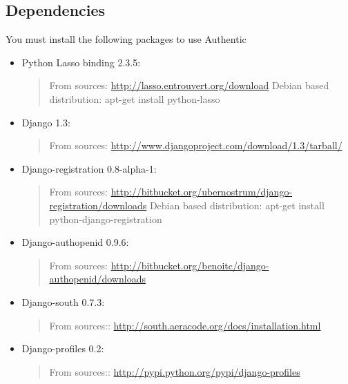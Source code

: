 \documentclass[letterpaper,10pt,english]{sphinxmanual}
\begin{document}
\subsection{Dependencies}
\label{installation:dependencies}
You must install the following packages to use Authentic
\begin{itemize}
\item {} 
Python Lasso binding 2.3.5:
\begin{quote}

From sources: \href{http://lasso.entrouvert.org/download}{http://lasso.entrouvert.org/download}
Debian based distribution: apt-get install python-lasso
\end{quote}

\item {} 
Django 1.3:
\begin{quote}

From sources: \href{http://www.djangoproject.com/download/1.3/tarball/}{http://www.djangoproject.com/download/1.3/tarball/}
\end{quote}

\item {} 
Django-registration 0.8-alpha-1:
\begin{quote}

From sources: \href{http://bitbucket.org/ubernostrum/django-registration/downloads}{http://bitbucket.org/ubernostrum/django-registration/downloads}
Debian based distribution: apt-get install python-django-registration
\end{quote}

\item {} 
Django-authopenid 0.9.6:
\begin{quote}

From sources: \href{http://bitbucket.org/benoitc/django-authopenid/downloads}{http://bitbucket.org/benoitc/django-authopenid/downloads}
\end{quote}

\item {} 
Django-south 0.7.3:
\begin{quote}

From sources:: \href{http://south.aeracode.org/docs/installation.html}{http://south.aeracode.org/docs/installation.html}
\end{quote}

\item {} 
Django-profiles 0.2:
\begin{quote}

From sources:: \href{http://pypi.python.org/pypi/django-profiles}{http://pypi.python.org/pypi/django-profiles}
\end{quote}

\end{itemize}
\end{document}
